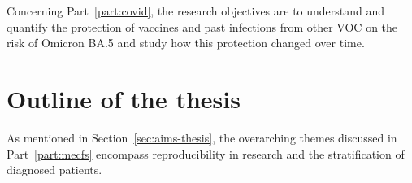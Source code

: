 Concerning Part~\ref{part:covid}, the research objectives are to understand and quantify the protection of \sars vaccines and past infections from other VOC on the risk of Omicron BA.5 and study how this protection changed over time.


\section{Outline of the thesis}
\label{sec:structure-thesis}


As mentioned in Section~\ref{sec:aims-thesis}, the overarching themes discussed in Part~\ref{part:mecfs} encompass reproducibility in \cfs research and the stratification of diagnosed patients. %


